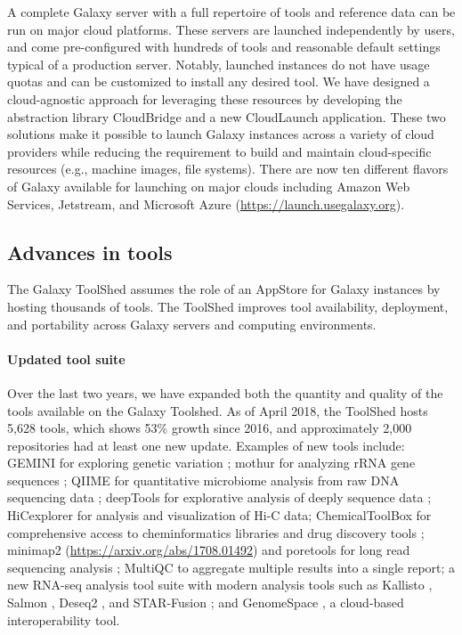 A complete Galaxy server with a full repertoire of tools and reference data can be run on major cloud platforms. These servers are launched independently by users, and come pre-configured with hundreds of tools and reasonable default settings typical of a production server. Notably, launched instances do not have usage quotas and can be customized to install any desired tool. We have designed a cloud-agnostic approach for leveraging these resources by developing the abstraction library CloudBridge \cite{goonasekera2016cloudbridge} and a new CloudLaunch application. These two solutions make it possible to launch Galaxy instances across a variety of cloud providers while reducing the requirement to build and maintain cloud-specific resources (e.g., machine images, file systems). There are now ten different flavors of Galaxy available for launching on major clouds including Amazon Web Services, Jetstream, and Microsoft Azure (\url{https://launch.usegalaxy.org}).

\subsection*{Advances in tools}
The Galaxy ToolShed \cite{blankenberg2014dissemination} assumes the role of an AppStore for Galaxy instances by hosting thousands of tools. The ToolShed improves tool availability, deployment, and portability across Galaxy servers and computing environments.

\paragraph*{Updated tool suite} Over the last two years, we have expanded both the quantity and quality of the tools available on the Galaxy Toolshed. As of April 2018, the ToolShed hosts 5,628 tools, which shows 53\% growth since 2016, and approximately 2,000 repositories had at least one new update. Examples of new tools include: GEMINI for exploring genetic variation \cite{paila2013gemini}; mothur for analyzing rRNA gene sequences \cite{schloss2009introducing}; QIIME for quantitative microbiome analysis from raw DNA sequencing data \cite{caporaso2010qiime}; deepTools for explorative analysis of deeply sequence data \cite{ramirez2014deeptools,ramirez2016deeptools2}; HiCexplorer \cite{ramirez2018high} for analysis and visualization of Hi-C data; ChemicalToolBox for comprehensive access to cheminformatics libraries and drug discovery tools \cite{lucas2014chemicaltoolbox}; minimap2 (\url{https://arxiv.org/abs/1708.01492}) and poretools for long read sequencing analysis \cite{loman2014poretools}; MultiQC \cite{ewels2016multiqc} to aggregate multiple results into a single report; a new RNA-seq analysis tool suite with modern analysis tools such as Kallisto \cite{bray2016near}, Salmon \cite{patro2017salmon}, Deseq2 \cite{love2014moderated}, and STAR-Fusion \cite{dobin2013star}; and GenomeSpace \cite{qu2016integrative}, a cloud-based interoperability tool.

